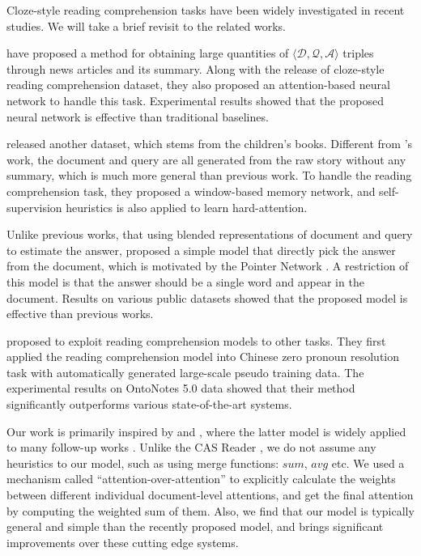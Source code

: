 \documentclass[11pt,a4paper]{article}
\begin{document}
Cloze-style reading comprehension tasks have been widely investigated in recent studies. 
We will take a brief revisit to the related works.

 have proposed a method for obtaining large quantities of $\langle \mathcal D, \mathcal Q, \mathcal A \rangle$ triples through news articles and its summary. Along with the release of cloze-style reading comprehension dataset, they also proposed an attention-based neural network to handle this task. Experimental results showed that the proposed neural network is effective than traditional baselines.

 released another dataset, which stems from the children's books. Different from 's work, the document and query are all generated from the raw story without any summary, which is much more general than previous work. To handle the reading comprehension task, they proposed a window-based memory network, and self-supervision heuristics is also applied to learn hard-attention. 

Unlike previous works, that using blended representations of document and query to estimate the answer,  proposed a simple model that directly pick the answer from the document, which is motivated by the Pointer Network \cite{vinyals-etal-2015}. A restriction of this model is that the answer should be a single word and appear in the document. Results on various public datasets showed that the proposed model is effective than previous works.

\citet{liu-etal-2016} proposed to exploit reading comprehension models to other tasks. They first applied the reading comprehension model into Chinese zero pronoun resolution task with automatically generated large-scale pseudo training data. The experimental results on OntoNotes 5.0 data showed that their method significantly outperforms various state-of-the-art systems.

Our work is primarily inspired by  and  , where the latter model is widely applied to many follow-up works \cite{sordoni-etal-2016,trischler-etal-2016,cui-etal-2016}. Unlike the CAS Reader \cite{cui-etal-2016}, we do not assume any heuristics to our model, such as using merge functions: $sum$, $avg$ etc. We used a mechanism called ``attention-over-attention'' to explicitly calculate the weights between different individual document-level attentions, and get the final attention by computing the weighted sum of them. Also, we find that our model is typically general and simple than the recently proposed model, and brings significant improvements over these cutting edge systems.
\end{document}
